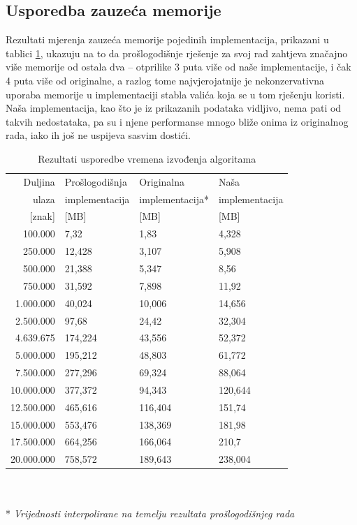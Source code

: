 \documentclass[a4paper,12pt]{article}
\begin{document}
\clearpage
\subsection{Usporedba zauzeća memorije}

Rezultati mjerenja zauzeća memorije pojedinih implementacija, prikazani u tablici \ref{tableMemComp}, ukazuju na to da prošlogodišnje rješenje za svoj rad zahtjeva značajno više memorije od ostala dva -- otprilike 3 puta više od naše implementacije, i čak 4 puta više od originalne, a razlog tome najvjerojatnije je nekonzervativna uporaba memorije u implementaciji stabla valića koja se u tom rješenju koristi. Naša implementacija, kao što je iz prikazanih podataka vidljivo, nema pati od takvih nedostataka, pa su i njene performanse mnogo bliže onima iz originalnog rada, iako ih još ne uspijeva sasvim dostići.

\begin{table}[h!]
	\caption{Rezultati usporedbe vremena izvođenja algoritama}
	\label{tableMemComp}
	\begin{center}
		\begin{tabular}{rlll}
			\toprule
			Duljina & Prošlogodišnja & Originalna & Naša \\
			ulaza & implementacija & implementacija* & implementacija \\
			{[znak]} & [MB] & [MB] & [MB] \\
			\midrule
			100.000     &   7,32    &   1,83    &   4,328   \\
			250.000     &   12,428  &   3,107   &   5,908   \\
			500.000     &   21,388  &   5,347   &   8,56    \\
			750.000     &   31,592  &   7,898   &   11,92   \\
			1.000.000   &   40,024  &   10,006  &   14,656  \\
			2.500.000   &   97,68   &   24,42   &   32,304  \\
			4.639.675   &   174,224 &   43,556  &   52,372  \\
			5.000.000   &   195,212 &   48,803  &   61,772  \\
			7.500.000   &   277,296 &   69,324  &   88,064  \\
			10.000.000  &   377,372 &   94,343  &   120,644 \\
			12.500.000  &   465,616 &   116,404 &   151,74  \\
			15.000.000  &   553,476 &   138,369 &   181,98  \\
			17.500.000  &   664,256 &   166,064 &   210,7   \\
			20.000.000  &   758,572 &   189,643 &   238,004 \\
			\bottomrule
		\end{tabular}\\ ~ \\
		* \textit{Vrijednosti interpolirane na temelju rezultata prošlogodišnjeg rada}
	\end{center}
\end{table}
\end{document}
